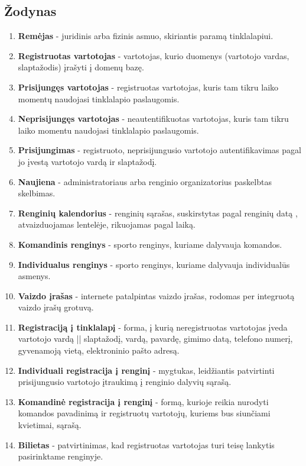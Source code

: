 \documentclass{VUMIFPSkursinis}
\begin{document}
        \subsection*{Žodynas} \label{strukturinisDSModelis_zodynas}
            \begin{enumerate}[label=\textbf{E\arabic*.}]
					\item \textbf{Remėjas} - juridinis arba fizinis asmuo, skiriantis paramą tinklalapiui.
					\item \textbf{Registruotas vartotojas} - vartotojas, kurio duomenys (vartotojo vardas, slaptažodis) įrašyti į domenų bazę.
					\item \textbf{Prisijungęs vartotojas} - registruotas vartotojas, kuris tam tikru laiko momentų naudojasi tinklalapio paslaugomis.
					\item \textbf{Neprisijungęs vartotojas} - neautentifikuotas vartotojas, kuris tam tikru laiko momentu naudojasi tinklalapio paslaugomis.
					\item \textbf{Prisijungimas} -  registruoto, neprisijungusio vartotojo autentifikavimas pagal jo įvestą vartotojo vardą ir slaptažodį.
					\item \textbf{Naujiena} - administratoriaus arba renginio organizatorius paskelbtas skelbimas.
					\item \textbf{Renginių kalendorius} - renginių sąrašas, suskirstytas pagal renginių datą , atvaizduojamas lentelėje, rikuojamas pagal laiką.
					\item \textbf{Komandinis renginys} - sporto renginys, kuriame dalyvauja komandos.
					\item \textbf{Individualus renginys} - sporto renginys, kuriame dalyvauja individualūs asmenys.
					\item \textbf{Vaizdo įrašas} -  internete patalpintas vaizdo įrašas, rodomas per integruotą vaizdo įrašų grotuvą.
					\item \textbf{Registraciją į tinklalapį} - forma, į kurią neregistruotas vartotojas įveda vartotojo vardą || slaptažodį, vardą, pavardę, gimimo datą, telefono numerį, gyvenamoją vietą, elektroninio pašto adresą.
					\item \textbf{Individuali registracija į renginį} - mygtukas, leidžiantis patvirtinti prisijungusio vartotojo įtraukimą į renginio dalyvių sąrašą.
					\item \textbf{Komandinė registracija į renginį} -  formą, kurioje reikia nurodyti komandos pavadinimą ir registruotų vartotojų, kuriems bus siunčiami kvietimai, sąrašą.
					\item \textbf{Bilietas} - patvirtinimas, kad registruotas vartotojas turi teisę lankytis pasirinktame renginyje.

\end{enumerate}
\end{document}

